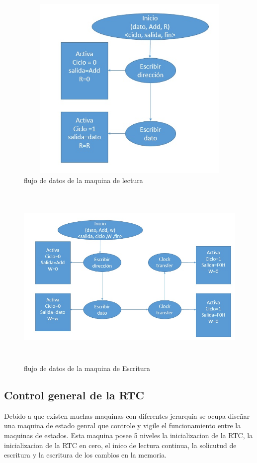 \documentclass[12pt,a4paper]{article}
\begin{document}
		\begin{figure}[htbp]
			\centering
			\includegraphics[height=9cm, width=16cm]{img/FlujoLec.jpg}
			\caption[3erNivel]{flujo de datos de la maquina de lectura}
			\label{fig:FML}
		\end{figure}
		\begin{figure}[htbp]
			\centering
			\includegraphics[height=9cm, width=16cm]{img/FlujoEsc.jpg}
			\caption[3erNivel]{flujo de datos de la maquina de Escritura}
			\label{fig:FME}
		\end{figure}
		\subsection{Control general de la RTC}
		
		Debido a que existen muchas maquinas con diferentes jerarquia se ocupa diseñar una maquina de estado genral que controle y vigile el funcionamiento entre la maquinas de estados.
		Esta maquina posee 5 niveles la inicializacion de la RTC, la inicializacion de la RTC en cero, el inico de lectura continua, la solicutud de escritura y la escritura de los cambios en la memoria.
		
\end{document}
